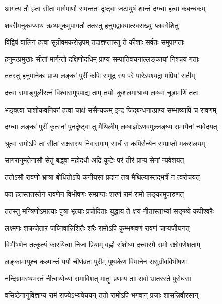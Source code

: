 \twolineshloka
{आगत्य तौ हृतां सीतां मार्गमाणौ समन्ततः}
{दृष्ट्वा जटायुषं शान्तं दग्ध्वा हत्वा कबन्धकम्}%

\twolineshloka
{शबरीमनुकम्प्याथ ऋष्यमूकमुपागतौ}
{ततस्तु हनुमद्वाक्यात्स्वसख्युः प्लवगेशितुः}%

\twolineshloka
{विद्विषं वालिनं हत्वा सुग्रीवमकरोन्नृपम्}
{तदाज्ञप्तास्तु ते कीशाः सर्वतः समुपागताः}%

\twolineshloka
{हनुमत्प्रमुखाः सीतां मार्गन्तो दक्षिणोदधिम्}
{प्राप्य सम्पातिवचनाल्लङ्कायां निश्चयं गताः}%

\twolineshloka
{ततस्तु हनुमानेकः प्राप्य लङ्कां पुरीं कपिः}
{समुद्र स्य परे पारेऽपश्यद्रा मप्रियां सतीम्}%

\twolineshloka
{दत्त्वा रामाङ्गुलीरत्नं विश्वासमुपपाद्य ताम्}
{तयोः कुशलमाश्राव्य लब्ध्वा चूडामणिं ततः}%

\twolineshloka
{भङ्क्त्वा चाशोकवनिकां हत्वा चाक्षं ससैन्यकम्}
{इन्द्र जिद्बन्धनात्प्राप्य सम्भाष्यापि च रावणम्}%

\twolineshloka
{दग्ध्वा लङ्कां पुरीं कृत्स्नां पुनर्दृष्ट्वा तु मैथिलीम्}
{लब्धाज्ञोऽणवमुल्लङ्घ्य रामायैनां न्यवेदयत्}%

\twolineshloka
{श्रुत्वा रामोऽपि तां सीतां राक्षसस्य निवासगाम्}
{सार्धं स कपिसैन्येन सम्प्राप्तो मकरालयम्}%

\twolineshloka
{सागरानुमतेनासौ सेतुं बद्ध्वा महोदधौ}
{अद्रि कूटेः परं तीरं प्राप्य सेनां न्यवेशयत्}%

\twolineshloka
{ततोऽसौ रावणो भ्रात्रा बोधितोऽपि कनीयसा}
{प्रदानं तत्र मैथिल्यास्तद्भर्त्रे न त्वरोचयत्}%

\twolineshloka
{पदा हतस्ततस्तेन रावणेन विभीषणः}
{सम्प्राप्तः शरणं रामं रामो लङ्कामुपारुणत्}%

\twolineshloka
{ततस्तु मन्त्रिणोऽमात्याः पुत्रा भृत्याः प्रचोदिताः}
{युद्धाय ते क्षयं नीतास्ताभ्यां सङ्ख्ये कपीश्वरैः}%

\twolineshloka
{लक्ष्मणः शक्रजेतारं जघ्निवान्निशितैः शरैः}
{रामोऽपि कुम्भश्रवणं रावणं चाप्यजीघनत्}%

\twolineshloka
{विभीषणेन तत्कृत्यं कारयित्वा निजां प्रियाम्}
{वह्नौ संशोध्य दत्त्वास्मै रामो रक्षोगणेशताम्}%

\twolineshloka
{लङ्कामायुश्च कल्पान्तं ययौ चीर्णव्रतः पुरीम्}
{पुष्पकेण विमानेन ससुग्रीवविभीषणः}%

\twolineshloka
{नन्दिग्रामस्थभरतं नीत्वायोध्यां समाविशत्}
{मातॄः प्रणम्य ताः सर्वा भ्रातरस्ते पुरोधसा}%

\twolineshloka
{वसिष्ठेनानुविज्ञाप्य रामं राज्येऽभ्यषेचयन्}
{ततो रामोऽपि भगवान् प्रजाः शासन्निवौरसान्}%

